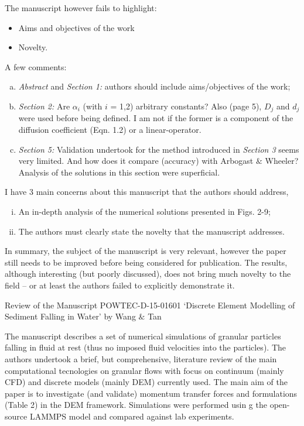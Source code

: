 \documentclass[14pt,twoside]{report}
\begin{document}
The manuscript however fails to highlight:
  \begin{itemize}
    \item Aims and objectives of the work
    \item Novelty.
  \end{itemize}
A few comments:
\begin{enumerate}[(a)] 
%
\item {\it Abstract} and {\it Section 1:} authors should include aims/objectives of the work;
%
\item {\it Section 2:} Are $\alpha_{i}$ (with $i$ = 1,2) arbitrary constants? Also (page 5), $D_{j}$ and $d_{j}$ were used before being defined. I am not if the former is a component of the diffusion coefficient (Eqn. 1.2) or a linear-operator.
%
\item {\it Section 5:} Validation undertook for the method introduced in {\it Section 3} seems very limited. And how does it compare (accuracy) with Arbogast $\&$ Wheeler? Analysis of the solutions in this section were superficial.
%
\end{enumerate}
I have 3 main concerns about this manuscript that the authors should address,
\begin{enumerate}[(i)]
\item An in-depth analysis of the numerical solutions presented in Figs. 2-9;
\item The authors must clearly state the novelty that the manuscript addresses.
\end{enumerate}

In summary, the subject of the manuscript is very relevant, however the paper still needs to be improved before being considered for publication. The results, although interesting (but poorly discussed), does not bring much novelty to the field -- or at least the authors failed to explicitly demonstrate it. 

\clearpage



\begin{center}
  {\Large Review of the Manuscript POWTEC-D-15-01601 `Discrete Element Modelling of Sediment Falling in Water' by Wang $\&$ Tan}
\end{center}

\medskip

The manuscript describes a set of numerical simulations of granular particles falling in fluid at rest (thus no imposed fluid velocities into the particles). The authors undertook a brief, but comprehensive, literature review of the main computational tecnologies on granular flows with focus on continuum (mainly CFD) and discrete models (mainly DEM) currently used. The main aim of the paper is to investigate (and validate) momentum transfer forces and formulations (Table 2) in the DEM framework. Simulations were performed usin g the open-source LAMMPS model and compared against lab experiments.
\end{document}
